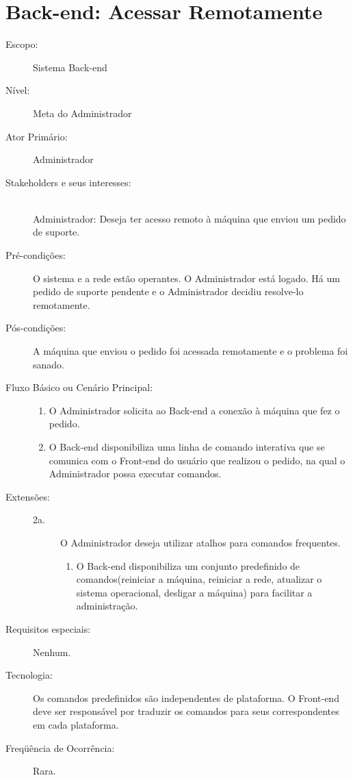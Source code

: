 \documentclass[brazil,times]{abnt}
\begin{document}
\section{Back-end: Acessar Remotamente} \label{Acessar-Remotamente}
\begin{description}
\item[Escopo:] Sistema Back-end
\item[Nível:] Meta do Administrador
\item[Ator Primário:] Administrador
\item[Stakeholders e seus interesses:] \hfill \\
Administrador: Deseja ter acesso remoto à máquina que enviou um pedido de
suporte.

\item[Pré-condições:] O sistema e a rede estão operantes. O Administrador está
logado. Há um pedido de suporte pendente e o Administrador decidiu resolve-lo
remotamente.
\item[Pós-condições:] A máquina que enviou o pedido foi acessada remotamente e o
problema foi sanado.
\item[Fluxo Básico ou Cenário Principal:]\hfill
\begin{enumerate}
  \item O Administrador solicita ao Back-end a conexão à máquina que fez o
  pedido.
  \item O Back-end disponibiliza uma linha de comando interativa que se
  comunica com o Front-end do usuário que realizou o pedido, na qual o
  Administrador possa executar comandos.
  
\end{enumerate}

\item[Extensões:]\hfill
\begin{description}
	\item[2a.] O Administrador deseja utilizar atalhos para comandos frequentes.
	\begin{enumerate}
 		\item O Back-end disponibiliza um conjunto predefinido de
  comandos(reiniciar a máquina, reiniciar a rede, atualizar o sistema
  operacional, desligar a máquina) para facilitar a administração.
	\end{enumerate} 

\end{description}
\item[Requisitos especiais:] Nenhum.
\item[Tecnologia:] Os comandos predefinidos são independentes de plataforma. O
Front-end deve ser responsável por traduzir os comandos para seus
correspondentes em cada plataforma.
\item[Freqüência de Ocorrência:] Rara.

\end{description}
\end{document}
